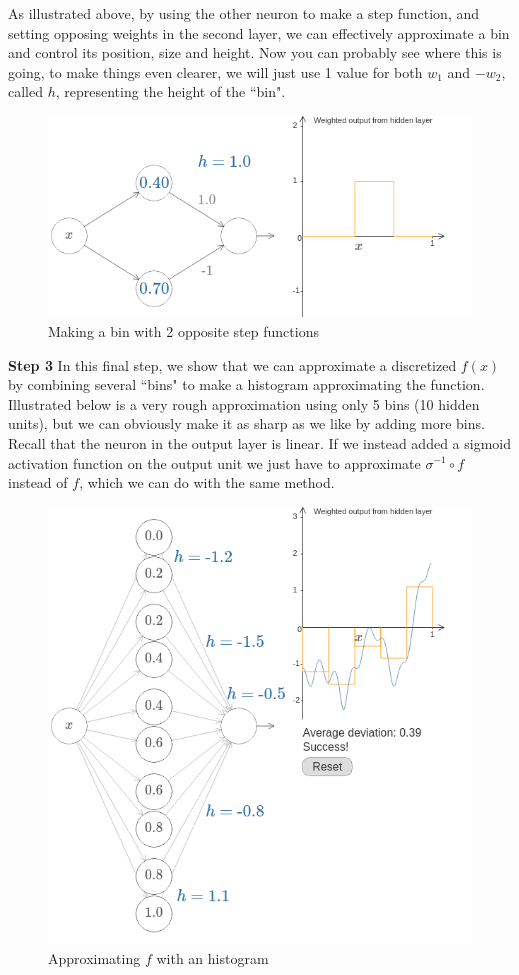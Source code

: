 \documentclass{article}
\begin{document}
As illustrated above, by using the other neuron to make a step function, and setting opposing weights in the second layer, we can effectively approximate a bin and control its position, size and height.
Now you can probably see where this is going, to make things even clearer, we will just use 1 value for both $w_1$ and $-w_2$, called $h$, representing the height of the ``bin".

\begin{figure}[H]
    \centering
    \includegraphics[width=.6\textwidth]{figures/bin_h.png}
    \caption{Making a bin with 2 opposite step functions}
\end{figure}

\textbf{Step 3} In this final step, we show that we can approximate a discretized $f(x)$ by combining several ``bins" to make a histogram approximating the function. Illustrated below is a very rough approximation using only 5 bins (10 hidden units), but we can obviously make it as sharp as we like by adding more bins. Recall that the neuron in the output layer is linear. If we instead added a sigmoid activation function on the output unit we just have to approximate $\sigma^{-1}\circ f$ instead of $f$, which we can do with the same method.


\begin{figure}[H]
    \centering
    \includegraphics[width=.6\textwidth]{figures/discretize.png}
    \caption{Approximating $f$ with an histogram}
\end{figure}
\end{document}

